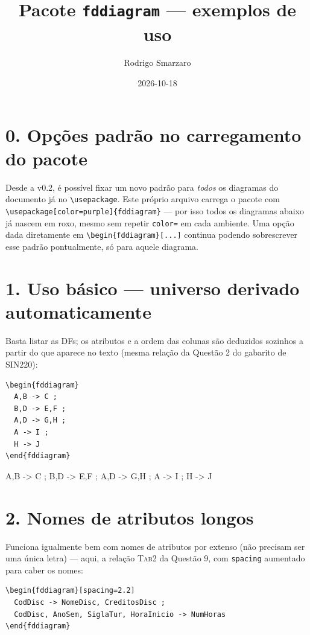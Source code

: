 \documentclass[a4paper]{article}
\title{Pacote \texttt{fddiagram} --- exemplos de uso}
\author{Rodrigo Smarzaro}
\date{2026-10-18}
\begin{document}
\maketitle

\section*{0. Opções padrão no carregamento do pacote}

Desde a v0.2, é possível fixar um novo padrão para \emph{todos} os
diagramas do documento já no \verb|\usepackage|. Este próprio arquivo
carrega o pacote com \verb|\usepackage[color=purple]{fddiagram}|
--- por isso todos os diagramas abaixo já nascem em roxo, mesmo sem
repetir \texttt{color=} em cada ambiente. Uma opção dada diretamente
em \verb|\begin{fddiagram}[...]| continua podendo sobrescrever esse
padrão pontualmente, só para aquele diagrama.

\section*{1. Uso básico --- universo derivado automaticamente}

Basta listar as DFs; os atributos e a ordem das colunas são deduzidos
sozinhos a partir do que aparece no texto (mesma relação da Questão 2
do gabarito de SIN220):

\begin{verbatim}
\begin{fddiagram}
  A,B -> C ;
  B,D -> E,F ;
  A,D -> G,H ;
  A -> I ;
  H -> J
\end{fddiagram}
\end{verbatim}

\begin{fddiagram}
  A,B -> C ;
  B,D -> E,F ;
  A,D -> G,H ;
  A -> I ;
  H -> J
\end{fddiagram}

\section*{2. Nomes de atributos longos}

Funciona igualmente bem com nomes de atributos por extenso (não
precisam ser uma única letra) --- aqui, a relação \textsc{Tab2} da
Questão 9, com \texttt{spacing} aumentado para caber os nomes:

\begin{verbatim}
\begin{fddiagram}[spacing=2.2]
  CodDisc -> NomeDisc, CreditosDisc ;
  CodDisc, AnoSem, SiglaTur, HoraInicio -> NumHoras
\end{fddiagram}
\end{verbatim}
\end{document}
